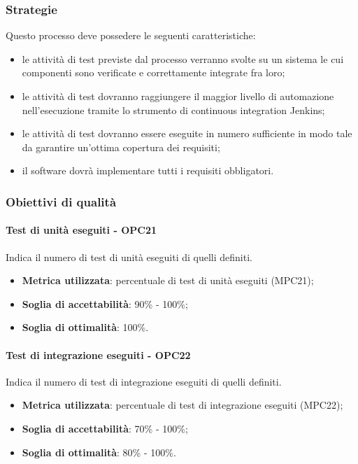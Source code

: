 \documentclass[PianoDiQualifica.tex]{subfiles}
\begin{document}
		\subsubsection{Strategie}
			Questo processo deve possedere le seguenti caratteristiche:
			\begin{itemize}
				\item le attività di test previste dal processo verranno svolte su un sistema le cui componenti sono verificate e correttamente integrate fra loro;
				\item le attività di test dovranno raggiungere il maggior livello di automazione nell'esecuzione tramite lo strumento di continuous integration Jenkins;
				\item le attività di test dovranno essere eseguite in numero sufficiente in modo tale da garantire un'ottima copertura dei requisiti;
				\item il software dovrà implementare tutti i requisiti obbligatori. 
			\end{itemize}
		
		\subsubsection{Obiettivi di qualità}
			\paragraph{Test di unità eseguiti - OPC21}
				Indica il numero di test di unità eseguiti di quelli definiti.
				\begin{itemize}
					\item \textbf{Metrica utilizzata}: percentuale di test di unità eseguiti (MPC21);
					\item \textbf{Soglia di accettabilità}: 90\% - 100\%;
					\item \textbf{Soglia di ottimalità}: 100\%.
				\end{itemize}
			
			\paragraph{Test di integrazione eseguiti - OPC22}
				Indica il numero di test di integrazione eseguiti di quelli definiti.
				\begin{itemize}
					\item \textbf{Metrica utilizzata}: percentuale di test di integrazione eseguiti (MPC22);
					\item \textbf{Soglia di accettabilità}: 70\% - 100\%;
					\item \textbf{Soglia di ottimalità}: 80\% - 100\%.
				\end{itemize}
				
\end{document}
